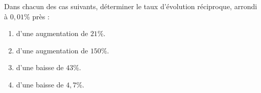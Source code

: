 \begin{exo}{}
	Dans chacun des cas suivants, déterminer le taux d'évolution réciproque, arrondi à $0,01$\% près :
	\begin{enumerate}
		\item d'une augmentation de $21\%$.
		\item d'une augmentation de $150\%$.
		\item d'une baisse de $43\%$.
		\item d'une baisse de $4,7$\%.
	\end{enumerate}
\end{exo}
